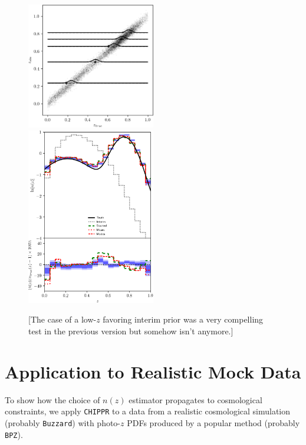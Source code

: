 \documentclass[iop]{emulateapj}
\newcommand{\chippr}{\texttt{CHIPPR} }
\begin{document}
\begin{figure}
	\begin{center}
		
\includegraphics[width=0.5\textwidth]{fig/training_prior/scatter.png}\\
		
\includegraphics[width=0.5\textwidth]{fig/training_prior/estimators.png}	
		\caption{[The case of a low-$z$ favoring interim prior was a 
very compelling test in the previous version but somehow isn't anymore.]}
		\label{fig:trainintpr}
	\end{center}
\end{figure}

\section{Application to Realistic Mock Data}
\label{sec:application}

To show how the choice of $n(z)$ estimator propagates to cosmological 
constraints, we apply \chippr to a data from a realistic cosmological 
simulation (probably \texttt{Buzzard}) with photo-$z$ PDFs produced by a 
popular method (probably \texttt{BPZ}).
\end{document}
